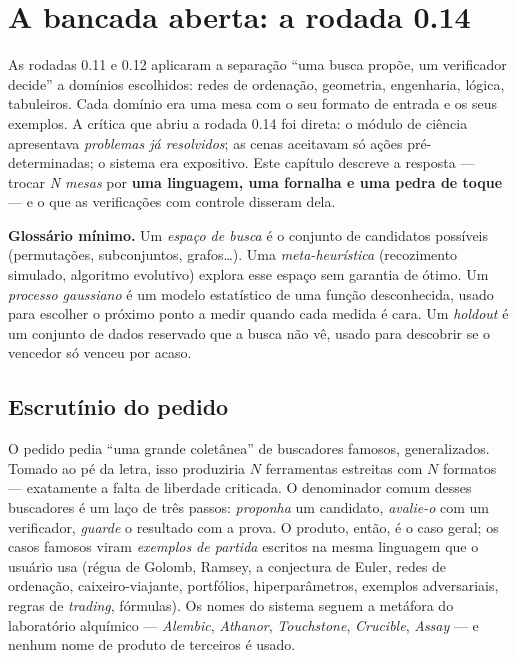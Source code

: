 \chapter{A bancada aberta: a rodada 0.14}\label{cap:bancada}

As rodadas 0.11 e 0.12 aplicaram a separação ``uma busca propõe, um verificador decide'' a domínios escolhidos: redes de ordenação, geometria, engenharia, lógica, tabuleiros. Cada domínio era uma mesa com o seu formato de entrada e os seus exemplos. A crítica que abriu a rodada 0.14 foi direta: o módulo de ciência apresentava \emph{problemas já resolvidos}; as cenas aceitavam só ações pré-determinadas; o sistema era expositivo. Este capítulo descreve a resposta --- trocar \emph{N mesas} por \textbf{uma linguagem, uma fornalha e uma pedra de toque} --- e o que as verificações com controle disseram dela.

\begin{graduacao}
\textbf{Glossário mínimo.} Um \emph{espaço de busca} é o conjunto de candidatos possíveis (permutações, subconjuntos, grafos\ldots). Uma \emph{meta-heurística} (recozimento simulado, algoritmo evolutivo) explora esse espaço sem garantia de ótimo. Um \emph{processo gaussiano} é um modelo estatístico de uma função desconhecida, usado para escolher o próximo ponto a medir quando cada medida é cara. Um \emph{holdout} é um conjunto de dados reservado que a busca não vê, usado para descobrir se o vencedor só venceu por acaso.
\end{graduacao}

\section{Escrutínio do pedido}\label{sec:banc-escrutinio}

O pedido pedia ``uma grande coletânea'' de buscadores famosos, generalizados. Tomado ao pé da letra, isso produziria $N$ ferramentas estreitas com $N$ formatos --- exatamente a falta de liberdade criticada. O denominador comum desses buscadores é um laço de três passos: \emph{proponha} um candidato, \emph{avalie-o} com um verificador, \emph{guarde} o resultado com a prova. O produto, então, é o caso geral; os casos famosos viram \emph{exemplos de partida} escritos na mesma linguagem que o usuário usa (régua de Golomb, Ramsey, a conjectura de Euler, redes de ordenação, caixeiro-viajante, portfólios, hiperparâmetros, exemplos adversariais, regras de \textit{trading}, fórmulas). Os nomes do sistema seguem a metáfora do laboratório alquímico --- \emph{Alembic}, \emph{Athanor}, \emph{Touchstone}, \emph{Crucible}, \emph{Assay} --- e nenhum nome de produto de terceiros é usado.


